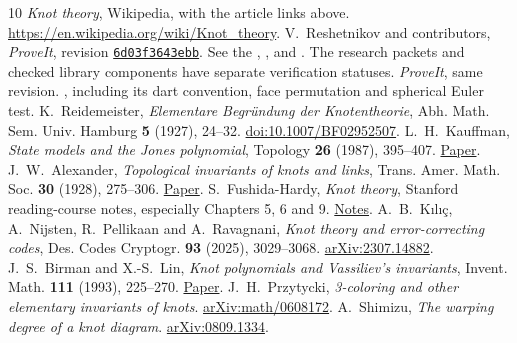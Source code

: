 \clearpage
\begin{thebibliography}{10}
 \emph{Knot theory}, Wikipedia, with the article links above. \url{https://en.wikipedia.org/wiki/Knot_theory}.
 V.~Reshetnikov and contributors, \emph{ProveIt}, revision \href{https://github.com/VladimirReshetnikov/ProveIt/commit/6d03f3643ebb91a6243eb1e35e7599b388197786}{\texttt{6d03f3643ebb}}. See the , , and . The research packets and checked library components have separate verification statuses.
 \emph{ProveIt}, same revision. , including its dart convention, face permutation and spherical Euler test.
 K.~Reidemeister, \emph{Elementare Begr\"undung der Knotentheorie}, Abh. Math. Sem. Univ. Hamburg \textbf{5} (1927), 24--32. \href{https://doi.org/10.1007/BF02952507}{doi:10.1007/BF02952507}.
 L.~H.~Kauffman, \emph{State models and the Jones polynomial}, Topology \textbf{26} (1987), 395--407. \href{https://webhomes.maths.ed.ac.uk/~v1ranick/papers/kauffmanjones.pdf}{Paper}.
 J.~W.~Alexander, \emph{Topological invariants of knots and links}, Trans. Amer. Math. Soc. \textbf{30} (1928), 275--306. \href{https://homepages.math.uic.edu/~kauffman/Alex.pdf}{Paper}.
 S.~Fushida-Hardy, \emph{Knot theory}, Stanford reading-course notes, especially Chapters 5, 6 and 9. \href{https://stanford.edu/~sfh/knot.pdf}{Notes}.
 A.~B.~K{\i}l{\i}\c{c}, A.~Nijsten, R.~Pellikaan and A.~Ravagnani, \emph{Knot theory and error-correcting codes}, Des. Codes Cryptogr. \textbf{93} (2025), 3029--3068. \href{https://arxiv.org/abs/2307.14882}{arXiv:2307.14882}.
 J.~S.~Birman and X.-S.~Lin, \emph{Knot polynomials and Vassiliev's invariants}, Invent. Math. \textbf{111} (1993), 225--270. \href{https://www.math.columbia.edu/~jb/v-inv.-knot-poly.pdf}{Paper}.
 J.~H.~Przytycki, \emph{3-coloring and other elementary invariants of knots}. \href{https://arxiv.org/abs/math/0608172}{arXiv:math/0608172}.
 A.~Shimizu, \emph{The warping degree of a knot diagram}. \href{https://arxiv.org/abs/0809.1334}{arXiv:0809.1334}.
\end{thebibliography}
